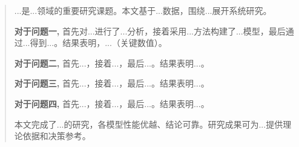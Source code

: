 
\begin{abstract}

...是...领域的重要研究课题。本文基于...数据，围绕...展开系统研究。

\textbf{对于问题一,} 首先对...进行了...分析，接着采用...方法构建了...模型，最后通过...得到...。结果表明，...（关键数值）。

\textbf{对于问题二,} 首先...，接着...，最后...。结果表明...。

\textbf{对于问题三,} 首先...，接着...，最后...。结果表明...。

\textbf{对于问题四,} 首先...，接着...，最后...。结果表明...。

本文完成了...的研究，各模型性能优越、结论可靠。研究成果可为...提供理论依据和决策参考。



\end{abstract}
